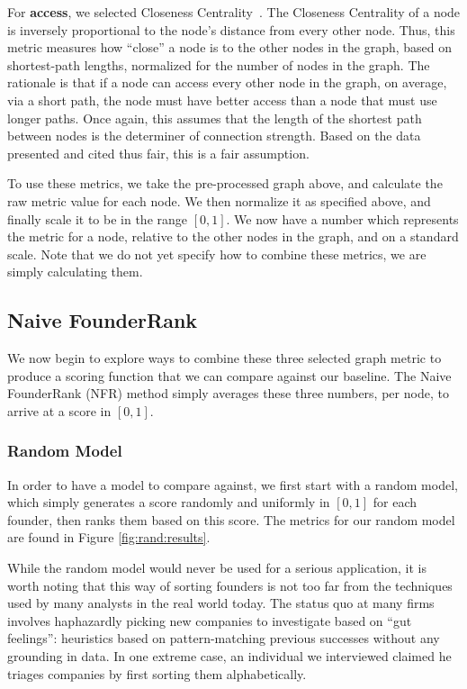 For \textbf{access}, we selected Closeness Centrality~\cite{FREEMAN1978215}. The Closeness Centrality of a node is inversely proportional to the node's distance from every other node. Thus, this metric measures how ``close'' a node is to the other nodes in the graph, based on shortest-path lengths, normalized for the number of nodes in the graph. The rationale is that if a node can access every other node in the graph, on average, via a short path, the node must have better access than a node that must use longer paths. Once again, this assumes that the length of the shortest path between nodes is the determiner of connection strength. Based on the data presented and cited thus fair, this is a fair assumption.

To use these metrics, we take the pre-processed graph above, and calculate the raw metric value for each node. We then normalize it as specified above, and finally scale it to be in the range $[0, 1]$. We now have a number which represents the metric for a node, relative to the other nodes in the graph, and on a standard scale. Note that we do not yet specify how to combine these metrics, we are simply calculating them.

\subsection{Naive FounderRank}

We now begin to explore ways to combine these three selected graph metric to produce a scoring function that we can compare against our baseline. The Naive FounderRank (NFR) method simply averages these three numbers, per node, to arrive at a score in $[0, 1]$.

\subsubsection{Random Model}

In order to have a model to compare against, we first start with a random model, which simply generates a score randomly and uniformly in $[0, 1]$ for each founder, then ranks them based on this score. The metrics for our random model are found in Figure \ref{fig:rand:results}.

While the random model would never be used for a serious application, it is worth noting that this way of sorting founders is not too far from the techniques used by many analysts in the real world today. The status quo at many firms involves haphazardly picking new companies to investigate based on ``gut feelings'': heuristics based on pattern-matching previous successes without any grounding in data. In one extreme case, an individual we interviewed claimed he triages companies by first sorting them alphabetically.

